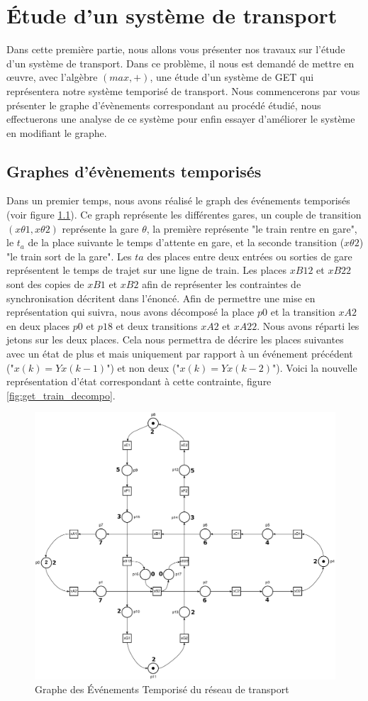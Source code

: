 \chapter{Étude d'un système de transport}
Dans cette première partie, nous allons vous présenter nos travaux sur l'étude d'un système de transport. Dans ce problème, il nous est demandé de mettre en œuvre, avec l'algèbre $(max,+)$, une étude d'un système de GET qui représentera notre système temporisé de transport. Nous commencerons par vous présenter le graphe d'évènements correspondant au procédé étudié, nous effectuerons une analyse de ce système pour enfin essayer d'améliorer le système en modifiant le graphe.

\section{Graphes d'évènements temporisés}
Dans un premier temps, nous avons réalisé le graph des événements temporisés (voir figure \ref{fig:get_train}). Ce graph représente les différentes gares, un couple de transition $(x \theta1,x\theta2)$ représente la gare $\theta$, la première représente "le train rentre en gare", le $t_a$ de la place suivante le temps d'attente en gare, et la seconde transition ($x\theta2$) "le train sort de la gare". Les $ta$ des places entre deux entrées ou sorties de gare représentent le temps de trajet sur une ligne de train. Les places $xB12$ et $xB22$ sont des copies  de $xB1$ et $xB2$ afin de représenter les contraintes de synchronisation décritent dans l'énoncé.
Afin de permettre une mise en représentation qui suivra, nous avons décomposé la place $p0$ et la transition $xA2$ en deux places $p0$ et $p18$ et deux transitions $xA2$ et $xA22$. Nous avons réparti les jetons sur les deux places. Cela nous permettra de décrire les places suivantes avec un état de plus et mais uniquement par rapport à un événement précédent ("$x(k)=Yx(k-1)$") et non deux ("$x(k)=Yx(k-2)$").
Voici la nouvelle représentation d'état correspondant à cette contrainte, figure \ref{fig:get_train_decompo}.
\begin{figure}[!ht]
\centering
\includegraphics[width =.8 \textwidth]{./I/images/train.pdf}
\caption{\label{fig:get_train} Graphe des Événements Temporisé du réseau de transport}
\end{figure}


